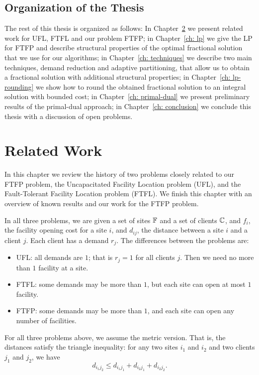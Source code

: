 \documentclass[oneside,final]{ucr}
\begin{document}
\section{Organization of the Thesis}
The rest of this thesis is organized as follows: In
Chapter~\ref{ch: related_work} we present related work for
UFL, FTFL and our problem FTFP; in Chapter~\ref{ch: lp} we
give the LP for FTFP and describe structural properties of
the optimal fractional solution that we use for our
algorithms; in Chapter~\ref{ch: techniques} we describe two
main techniques, demand reduction and adaptive partitioning,
that allow us to obtain a fractional solution with
additional structural properties; in Chapter~\ref{ch:
  lp-rounding} we show how to round the obtained fractional
solution to an integral solution with bounded cost; in
Chapter~\ref{ch: primal-dual} we present preliminary results
of the primal-dual approach; in Chapter~\ref{ch: conclusion}
we conclude this thesis with a discussion of open problems.


\chapter{Related Work} \label{ch: related_work}

In this chapter we review the history of two problems
closely related to our FTFP problem, the Uncapacitated
Facility Location problem (UFL), and the Fault-Tolerant
Facility Location problem (FTFL).  We finish this chapter
with an overview of known results and our work for the FTFP
problem.

In all three problems, we are given a set of sites
$\mathbb{F}$ and a set of clients $\mathbb{C}$, and $f_i$,
the facility opening cost for a site $i$, and $d_{ij}$, the
distance between a site $i$ and a client $j$. Each client
has a demand $r_j$. The differences between the problems
are:
\begin{itemize}
\item{UFL}: all demands are $1$; that is $r_j=1$ for
  all clients $j$. Then we need no more than $1$ facility at
  a site.
\item{FTFL}: some demands may be more than $1$, but
  each site can open at most $1$ facility.
\item{FTFP}: some demands may be more than $1$, and each site
  can open any number of facilities.
\end{itemize}
For all three problems above, we assume the metric
version. That is, the distances satisfy the triangle
inequality: for any two sites $i_1$ and $i_2$ and two
clients $j_1$ and $j_2$, we have
\begin{equation*}
  d_{i_1 j_2} \leq d_{i_1 j_1} + d_{i_2 j_1} + d_{i_2 j_2}.
\end{equation*}
\end{document}
